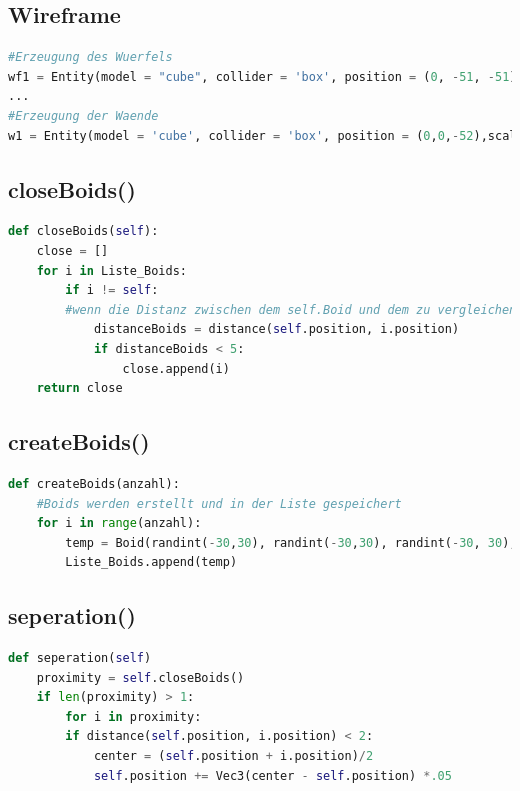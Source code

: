 \documentclass[a4paper, hidelinks, 12pt]{article}
\begin{document}
\subsection{Wireframe}\label{CodeRaum}
\begin{lstlisting}[style=mystyle, language=Python]
#Erzeugung des Wuerfels
wf1 = Entity(model = "cube", collider = 'box', position = (0, -51, -51), scale_x = 102)
...
#Erzeugung der Waende
w1 = Entity(model = 'cube', collider = 'box', position = (0,0,-52),scale=(110,110,0), color = color.red, alpha = 0)
\end{lstlisting}
\subsection{closeBoids()}\label{CodecloseBoids}
\begin{lstlisting}[style=mystyle, language=Python]
def closeBoids(self):
    close = []
    for i in Liste_Boids:
    	if i != self:
    	#wenn die Distanz zwischen dem self.Boid und dem zu vergleichenden Boid unter 5 liegt wird der vergleichende Boid in die Liste mit den Boids in der Naehe hinzugefuegt
		    distanceBoids = distance(self.position, i.position)
    		if distanceBoids < 5:
    			close.append(i)
    return close
\end{lstlisting}

\newpage
\subsection{createBoids()}\label{CodecreateBoids}
\begin{lstlisting}[style=mystyle, language=Python]
def createBoids(anzahl):
	#Boids werden erstellt und in der Liste gespeichert
	for i in range(anzahl):
		temp = Boid(randint(-30,30), randint(-30,30), randint(-30, 30), randint(0,360), randint(0,360), randint(0,360), uniform(0.0, 100.0), uniform(0.0, 10.0), 300.0, 1, groesse)
		Liste_Boids.append(temp)
\end{lstlisting}
\subsection{seperation()}\label{Codeseperation}
\begin{lstlisting}[style=mystyle, language=Python]
def seperation(self)
	proximity = self.closeBoids()
	if len(proximity) > 1:
		for i in proximity:
		if distance(self.position, i.position) < 2:
			center = (self.position + i.position)/2
			self.position += Vec3(center - self.position) *.05
\end{lstlisting}
\end{document}
